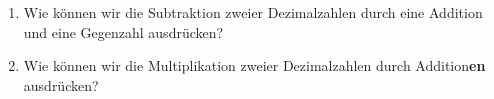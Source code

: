 \begin{exercise}
\begin{figure}[H]
\begin{minipage}{0.7\textwidth}
\begin{adjustbox}{width=\textwidth}
\end{adjustbox}

\end{minipage}
\end{figure}

%
%
%
%
%
%
%
%
\end{exercise}

\begin{exercise}[subtitle={Zusatzaufgabe}]
\begin{enumerate}
\item Wie können wir die Subtraktion zweier Dezimalzahlen durch eine Addition und eine Gegenzahl ausdrücken?

\fillwithgrid	{0.75in}

\item Wie können wir die Multiplikation zweier Dezimalzahlen durch Addition\textbf{en} ausdrücken?

\fillwithgrid	{0.75in}

\end{enumerate}
\end{exercise}

